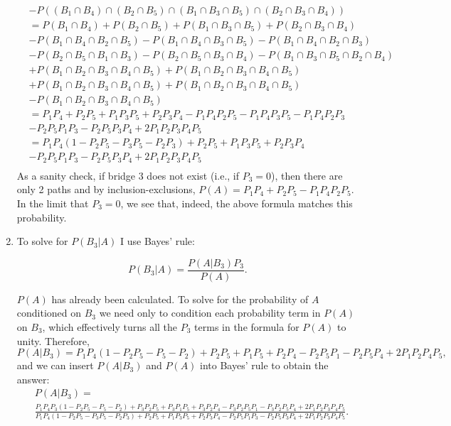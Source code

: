 \begin{problem}{34}
\begin{enumerate}
\begin{align*}
& - P((B_1\cap B_4) \cap (B_2\cap B_5) \cap (B_1 \cap B_3 \cap B_5) \cap (B_2 \cap B_3 \cap B_4) ) \\
&= P(B_1\cap B_4)+ P(B_2\cap B_5)+P(B_1 \cap B_3 \cap B_5)+P(B_2 \cap B_3 \cap B_4) \\
&- P(B_1\cap B_4\cap B_2\cap B_5)-P(B_1\cap B_4 \cap B_3 \cap B_5)-P(B_1\cap B_4\cap B_2 \cap B_3)\\
&-P(B_2\cap B_5 \cap B_1 \cap B_3 )-P(B_2\cap B_5 \cap B_3 \cap B_4)-P(B_1 \cap B_3 \cap B_5 \cap B_2 \cap B_4) \\
&+P(B_1\cap B_2 \cap B_3 \cap B_4 \cap B_5)+P(B_1\cap B_2 \cap B_3 \cap B_4 \cap B_5)\\
&+P(B_1\cap B_2 \cap B_3 \cap B_4 \cap B_5)+P(B_1\cap B_2 \cap B_3 \cap B_4 \cap B_5) \\
& - P(B_1\cap B_2 \cap B_3 \cap B_4 \cap B_5) \\
&= P_1 P_4+ P_2 P_5+P_1 P_3 P_5+P_2 P_3 P_4 - P_1 P_4 P_2 P_5-P_1 P_4 P_3 P_5-P_1 P_4 P_2 P_3\\
&-P_2 P_5 P_1 P_3 -P_2 P_5 P_3 P_4+2P_1 P_2 P_3 P_4 P_5  \\
&= P_1 P_4(1- P_2 P_5 -P_3 P_5-P_2 P_3)+ P_2 P_5+P_1 P_3 P_5+P_2 P_3 P_4 \\
&-P_2 P_5 P_1 P_3 -P_2 P_5 P_3 P_4+2P_1 P_2 P_3 P_4 P_5  \\
\end{align*}
As a sanity check, if bridge 3 does not exist (i.e., if $P_3 = 0$), then there are only 2 paths and by inclusion-exclusions, $P(A) = P_1 P_4+P_2 P_5 -P_1P_4P_2P_5$.  In the limit that $P_3=0$, we see that, indeed, the above formula matches this probability.  

\item To solve for $P(B_3|A)$ I use Bayes' rule:

\begin{equation*}
P(B_3|A) = \frac{P(A|B_3) P_3}{P(A)}.
\end{equation*}

$P(A)$ has already been calculated.  To solve for the probability of $A$ conditioned on $B_3$ we need only to condition each probability term in $P(A)$ on $B_3$, which effectively turns all the $P_3$ terms in the formula for $P(A)$ to unity.  Therefore,
\begin{equation*}
P(A|B_3) = P_1 P_4(1- P_2 P_5 -P_5-P_2)+ P_2 P_5+P_1 P_5+P_2 P_4 -P_2 P_5 P_1  -P_2 P_5 P_4+2P_1 P_2 P_4 P_5,
\end{equation*}
and we can insert $P(A|B_3)$ and $P(A)$ into Bayes' rule to obtain the answer:
\begin{align*}
&P(A|B_3) = \\
&\frac{P_1 P_4 P_3(1- P_2 P_5 -P_5-P_2)+ P_3 P_2 P_5+P_3 P_1 P_5+P_3 P_2 P_4 -P_3 P_2 P_5 P_1  -P_3 P_2 P_5 P_4+2P_1 P_2 P_3 P_4 P_5}{P_1 P_4(1- P_2 P_5 -P_3 P_5-P_2 P_3)+ P_2 P_5+P_1 P_3 P_5+P_2 P_3 P_4-P_2 P_5 P_1 P_3 -P_2 P_5 P_3 P_4+2P_1 P_2 P_3 P_4 P_5}.
\end{align*}



\end{enumerate}

\end{problem}

